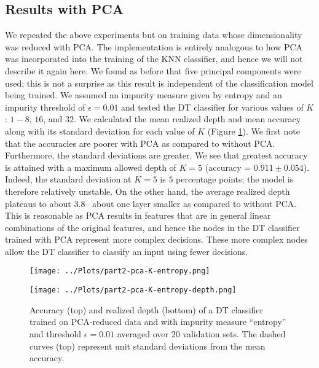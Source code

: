 \documentclass[12pt]{article}
\newcommand{\eps}{\epsilon}
\begin{document}
\subsection{Results with PCA}

We repeated the above experiments but on training data whose dimensionality was reduced with PCA. The implementation is entirely analogous to how PCA was incorporated into the training of the KNN classifier, and hence we will not describe it again here. We found as before that five principal components were used; this is not a surprise as this result is independent of the classification model being trained. We assumed an impurity measure given by entropy and an impurity threshold of $\eps=0.01$ and tested the DT classifier for various values of $K$: $1-8$, $16$, and $32$. We calculated the mean realized depth and mean accuracy along with its standard deviation for each value of $K$ (Figure \ref{part2-pca-K-entropy}). We first note that the accuracies are poorer with PCA as compared to without PCA. Furthermore, the standard deviations are greater. We see that greatest accuracy is attained with a maximum allowed depth of $K=5$ (accuracy = $0.911\pm 0.054$). Indeed, the standard deviation at $K=5$ is $5$ percentage points; the model is therefore relatively unstable. On the other hand, the average realized depth plateaus to about $3.8$-- about one layer smaller as compared to without PCA. This is reasonable as PCA results in features that are in general linear combinations of the original features, and hence the nodes in the DT classifier trained with PCA represent more complex decisions. These more complex nodes allow the DT classifier to classify an input using fewer decisions.

\begin{figure}
\centering
\texttt{[image: ../Plots/part2-pca-K-entropy.png]}

\texttt{[image: ../Plots/part2-pca-K-entropy-depth.png]}
\caption{\label{part2-pca-K-entropy} Accuracy (top) and realized depth (bottom) of a DT classifier trained on PCA-reduced data and with impurity measure ``entropy'' and threshold $\eps=0.01$ averaged over $20$ validation sets. The dashed curves (top) represent unit standard deviations from the mean accuracy.}
\end{figure}
\end{document}
